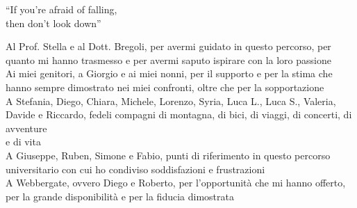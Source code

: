\begingroup
  \let\clearpage\endgroup
  \null{}
  \begin{minipage}{5.3in}
  
    \begin{flushright}
      \begin{em}
        ``If you're afraid of falling,\\then don't look down''
      \end{em}

      \vspace{4cm}

      \begin{em}
        Al Prof. Stella e al Dott. Bregoli, per avermi guidato in questo percorso, per quanto mi hanno trasmesso e 
        per avermi saputo ispirare con la loro passione\\[10pt]
        Ai miei genitori, a Giorgio e ai miei nonni, per il supporto e per la stima che hanno sempre dimostrato nei miei confronti,
        oltre che per la sopportazione\\[10pt]
        A Stefania, Diego, Chiara, Michele, Lorenzo, Syria, Luca L., Luca S., Valeria, Davide e Riccardo, fedeli compagni di montagna, di bici,
        di viaggi, di concerti, di avventure\\e di vita\\[10pt]
        A Giuseppe, Ruben, Simone e Fabio, punti di riferimento in questo percorso universitario
        con cui ho condiviso soddisfazioni e frustrazioni\\[10pt]
        A Webbergate, ovvero Diego e Roberto, per l'opportunità che mi hanno offerto, per la grande disponibilità e per 
        la fiducia dimostrata
      \end{em}
    \end{flushright}
  \end{minipage}
   \null
\endgroup